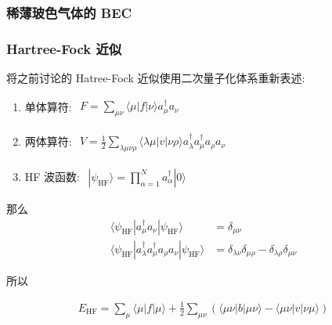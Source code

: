 \documentclass[../../main.tex]{subfiles}
\begin{document}
\subsubsection{稀薄玻色气体的 BEC}
\subsubsection{Hartree-Fock 近似}
将之前讨论的 Hatree-Fock 近似使用二次量子化体系重新表述:

\begin{enumerate}
  \item 单体算符: $\begin{aligned}
    F = \sum_{\mu\nu}\langle\mu|f|\nu\rangle a_{\mu}^{\dagger}a_{\nu}
  \end{aligned}$
  \item 两体算符: $\begin{aligned}
    V = \frac{1}{2}\sum_{\lambda\mu\nu\rho}\langle\lambda\mu|v|\nu\rho\rangle a_{\lambda}^{\dagger}a_{\mu}^{\dagger}a_{\rho}a_{\nu}
  \end{aligned}$
  \item HF 波函数: $\begin{aligned}
    |\psi_{\text{HF}}\rangle = \prod_{\alpha=1}^{N}a_{\alpha}^{\dagger}|0\rangle
  \end{aligned}$
\end{enumerate}
那么
\begin{align*}
  \langle\psi_{\text{HF}}|a_{\mu}^{\dagger}a_{\nu}|\psi_{\text{HF}}\rangle &= \delta_{\mu\nu}\\
  \langle\psi_{\text{HF}}|a_{\lambda}^{\dagger}a_{\mu}^{\dagger}a_{\rho}a_{\nu}|\psi_{\text{HF}}\rangle &= \delta_{\lambda\nu}\delta_{\mu\rho} - \delta_{\lambda\rho}\delta_{\mu\nu}
\end{align*}

所以

\begin{align*}
  E_{\text{HF}} = \sum_{\mu}\langle\mu|f|\mu\rangle + \frac{1}{2}\sum_{\mu\nu}\left(\langle\mu\nu|b|\mu\nu\rangle - \langle\mu\nu|v|\nu\mu\rangle\right)
\end{align*}
\end{document}
